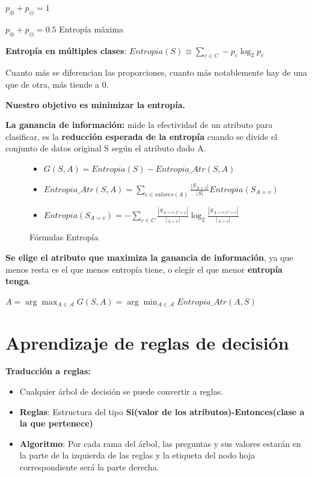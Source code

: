 \documentclass[12pt, twoside, openright]{report} %
\begin{document}
\(p_\oplus+p_\ominus=1\)

\(p_\oplus+p_\ominus=0.5\) Entropía máxima

\textbf{Entropía en múltiples clases}:
\(Entropia(S) \equiv \sum_{c\in C} -p_c \log _2 p_c\)

Cuanto más se diferencian las proporciones, cuanto más notablemente hay de una que de otra, más tiende a 0.

\textbf{Nuestro objetivo es minimizar la entropía.}

\textbf{La ganancia de información:} mide la efectividad de un atributo
para clasificar, es la \textbf{reducción esperada de la entropía} cuando
se divide el conjunto de datos original S según el atributo dado A.
\begin{figure}[H]
	\begin{itemize}
		\item \(G(S, A)=Entropia(S) - Entropia\_ Atr(S, A)\)
		\item \(Entropia\_ Atr(S, A)= \sum_{c \in valores(A)} \frac {|S_{A=v}|}{|S|} Entropia(S_{A=v})\)
		\item \(Entropia(S_{A=v})= -\sum_{c \in C} \frac {|S_{A=v, C=c}|}{|_{A=v}|} \log_2 \frac {|S_{A=v,C=c}|}{|_{A=v}|}\)
	\end{itemize}
	\captionsetup{justification=centering}
	\caption{Fórmulas Entropía}
\end{figure}


\textbf{Se elige el atributo que maximiza la ganancia de información},
ya que menos resta es el que menos entropía tiene, o elegir el que menor
\textbf{entropía tenga}.

\(A= \arg\max_{A \in \mathcal{A}} G(S,A) = \arg\min_{A \in \mathcal{A}} Entropia \_ Atr(A,S)\)

\section{Aprendizaje de reglas de
  decisión}

\textbf{Traducción a reglas:}

\begin{itemize}
	\item Cualquier árbol de decisión se puede convertir a reglas.
	\item \textbf{Reglas}: Estructura del tipo \textbf{Si(valor de los
		      atributos)-Entonces(clase a la que pertenece)}
	\item \textbf{Algoritmo}: Por cada rama del árbol, las preguntas y sus
	      valores estarán en la parte de la izquierda de las reglas y la
	      etiqueta del nodo hoja correspondiente será la parte derecha.
\end{itemize}
\end{document}
